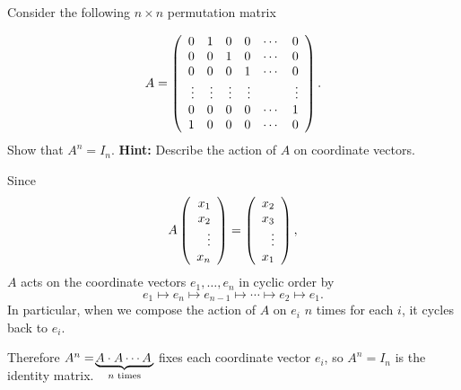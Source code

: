 \documentclass{ximera}
\begin{document}
\begin{exercise} \label{YZ_3.5_Permu8}
Consider the following $n\times n$ permutation matrix

\[
A=\left(\begin{array}{rrrrrrrrrrrrrrrrrr} 0&1&0&0&\cdots &0\\0&0&1&0&\cdots &0\\0&0&0&1&\cdots &0\\\vdots&\vdots&\vdots&\vdots&&\vdots\\0&0&0&0&\cdots&1\\1&0&0&0&\cdots&0 \end{array}\right).
\]
Show that $A^n=I_n$.
{\bf Hint:} Describe the action of $A$ on coordinate vectors.

\begin{solution}
\soln Since
\[
A\left(\begin{array}{rrrrrrrrrrrrrrrrrr} x_1\\x_2\\\vdots\\x_n \end{array}\right)=\left(\begin{array}{rrrrrrrrrrrrrrrrrr} x_2\\x_3\\\vdots\\x_1 \end{array}\right),
\]
$A$ acts on the coordinate vectors $e_1,\ldots,e_n$ in cyclic order by 
\[
e_1\mapsto e_n\mapsto e_{n-1}\mapsto \cdots \mapsto e_2\mapsto e_1.
\]
In particular, when we compose the action of $A$ on $e_i$ $n$ times for each $i$, it cycles back to $e_i$.



Therefore $A^n=\smash[b]{\! \underbrace{A\cdot A\cdots A\,}_\text{$n$ times}}$ fixes each coordinate vector $e_i$, so $A^n=I_n$ is the identity matrix.
\end{solution}
\end{exercise}
\end{document}
